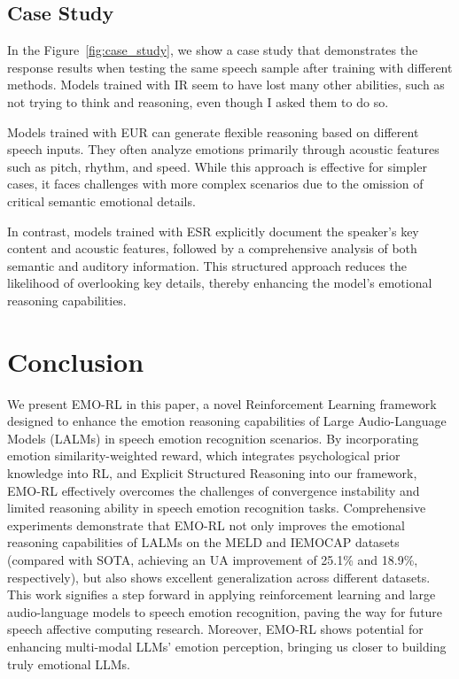 \documentclass[11pt]{article}
\begin{document}
\subsection{Case Study}
In the Figure~\ref{fig:case_study}, we show a case study that demonstrates the response results when testing the same speech sample after training with different methods.
Models trained with IR seem to have lost many other abilities, such as not trying to think and reasoning, even though I asked them to do so.

Models trained with EUR can generate flexible reasoning based on different speech inputs. They often analyze emotions primarily through acoustic features such as pitch, rhythm, and speed. While this approach is effective for simpler cases, it faces challenges with more complex scenarios due to the omission of critical semantic emotional details.

In contrast, models trained with ESR explicitly document the speaker's key content and acoustic features, followed by a comprehensive analysis of both semantic and auditory information. This structured approach reduces the likelihood of overlooking key details, thereby enhancing the model's emotional reasoning capabilities.

\section{Conclusion}
We present EMO-RL in this paper, a novel Reinforcement Learning framework designed to enhance the emotion reasoning capabilities of Large Audio-Language Models (LALMs) in speech emotion recognition scenarios.
By incorporating emotion similarity-weighted reward, which integrates psychological prior knowledge into RL, and Explicit Structured Reasoning into our framework, EMO-RL effectively overcomes the challenges of convergence instability and limited reasoning ability in speech emotion recognition tasks.
Comprehensive experiments demonstrate that EMO-RL not only improves the emotional reasoning capabilities of LALMs on the MELD and IEMOCAP datasets (compared with SOTA, achieving an UA improvement of 25.1\% and 18.9\%, respectively), but also shows excellent generalization across different datasets.
This work signifies a step forward in applying reinforcement learning and large audio-language models to speech emotion recognition, paving the way for future speech affective computing research. Moreover, EMO-RL shows potential for enhancing multi-modal LLMs' emotion perception, bringing us closer to building truly emotional LLMs.
\end{document}
